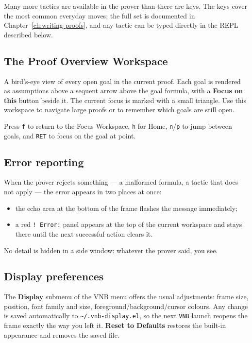 \begin{remark}
Many more tactics are available in the prover than there are
keys.  The keys cover the most common everyday moves; the
full set is documented in Chapter~\ref{ch:writing-proofs}, and any
tactic can be typed directly in the REPL described below.
\end{remark}

\subsection{The Proof Overview Workspace}

A bird's-eye view of every open goal in the current proof.  Each
goal is rendered as assumptions above a sequent arrow above the
goal formula, with a \textbf{Focus on this} button beside it.
The current focus is marked with a small triangle.  Use this
workspace to navigate large proofs or to remember which goals are
still open.

Press \texttt{f} to return to the Focus Workspace, \texttt{h} for
Home, \texttt{n}/\texttt{p} to jump between goals, and
\texttt{RET} to focus on the goal at point.

\subsection{Error reporting}

When the prover rejects something --- a malformed formula, a tactic
that does not apply --- the error appears in two places at once:

\begin{itemize}
\item the echo area at the bottom of the frame flashes the message
  immediately;
\item a red \texttt{! Error:} panel appears at the top of the
  current workspace and stays there until the next successful
  action clears it.
\end{itemize}

\noindent
No detail is hidden in a side window: whatever the prover said,
you see.

\subsection{Display preferences}

The \textbf{Display} submenu of the VNB menu offers the usual
adjustments: frame size, position, font family and size,
foreground/background/cursor colours.  Any change is saved
automatically to \texttt{\textasciitilde/.vnb-display.el}, so the
next \texttt{VNB} launch reopens the frame exactly the way you
left it.  \textbf{Reset to Defaults} restores the built-in
appearance and removes the saved file.

